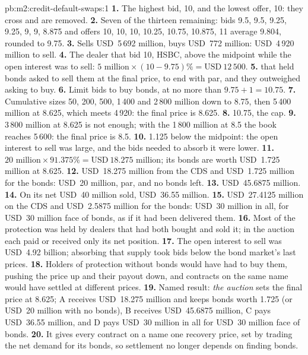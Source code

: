 \begin{solution}{pb:m2:credit-default-swaps:1}
\textbf{1.} The highest bid, 10, and the lowest offer, 10: they cross and are removed.
\textbf{2.} Seven of the thirteen remaining: bids 9.5, 9.5, 9.25, 9.25, 9, 9, 8.875 and
offers 10, 10, 10, 10.25, 10.75, 10.875, 11 average 9.804, rounded to 9.75.
\textbf{3.} Sells USD~5\,692 million, buys USD~772 million: USD~4\,920 million to sell.
\textbf{4.} The dealer that bid 10, HSBC, above the midpoint while the open interest was to
sell: $5\text{ million} \times (10 - 9.75)\% = \text{USD}~12\,500$.
\textbf{5.}  that held bonds asked to sell them at the final price, to
end with par, and they outweighed  asking to buy.
\textbf{6.} Limit bids to buy bonds, at no more than $9.75 + 1 = 10.75$.
\textbf{7.} Cumulative sizes 50, 200, 500, 1\,400 and 2\,800 million down to 8.75, then
5\,400 million at 8.625, which meets 4\,920: the final price is 8.625.
\textbf{8.} 10.75, the cap.
\textbf{9.} 3\,800 million at 8.625 is not enough; with the 1\,800 million at 8.5 the
book reaches 5\,600: the final price is 8.5.
\textbf{10.} 1.125 below the midpoint: the open interest to sell was large, and the bids
needed to absorb it were lower.
\textbf{11.} $20 \text{ million} \times 91.375\% = \text{USD}~18.275$ million; its bonds
are worth USD~1.725 million at 8.625.
\textbf{12.} USD~18.275 million from the CDS and USD~1.725 million for the bonds: USD~20
million, par, and no bonds left.
\textbf{13.} USD~45.6875 million.
\textbf{14.} On its net USD~40 million sold, USD~36.55 million.
\textbf{15.} USD~27.4125 million on the CDS and USD~2.5875 million for the bonds: USD~30
million in all, for USD~30 million face of bonds, as if it had been delivered them.
\textbf{16.} Most of the protection was held by dealers that had both bought and sold
it; in the auction each paid or received only its net position.
\textbf{17.} The open interest to sell was USD~4.92 billion; absorbing that supply took
bids below the bond market's last prices.
\textbf{18.} Holders of protection without bonds would have had to buy them, pushing the
price up and their payout down, and contracts on the same name would have settled at
different prices.
\textbf{19.} Named result: \emph{the auction} sets the final price at 8.625; A receives
USD~18.275 million and keeps bonds worth 1.725 (or USD~20 million with no bonds), B
receives USD~45.6875 million, C pays USD~36.55 million, and D pays USD~30 million in all
for USD~30 million face of bonds.
\textbf{20.} It gives every contract on a name one recovery price, set by trading the
net demand for its bonds, so settlement no longer depends on finding bonds.
\end{solution}

